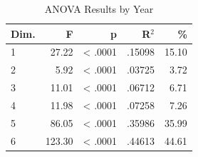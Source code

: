 \begin{table}[H]
  \centering
  \caption{ANOVA Results by Year}
  \label{tab:anova_year}
  \begin{tabular}{l r r r r}
    Dim. & F & p & R$^2$ & \% \\
    \hline
    1 & 27.22 & < .0001 & .15098 & 15.10 \\
    2 & 5.92 & < .0001 & .03725 & 3.72 \\
    3 & 11.01 & < .0001 & .06712 & 6.71 \\
    4 & 11.98 & < .0001 & .07258 & 7.26 \\
    5 & 86.05 & < .0001 & .35986 & 35.99 \\
    6 & 123.30 & < .0001 & .44613 & 44.61 \\
  \end{tabular}
\end{table}

